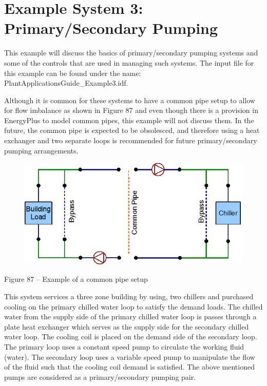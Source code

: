 \chapter{Example System 3: Primary/Secondary Pumping}\label{example-system-3-primarysecondary-pumping}

This example will discuss the basics of primary/secondary pumping systems and some of the controls that are used in managing such systems. The input file for this example can be found under the name: PlantApplicationsGuide\_Example3.idf.

Although it is common for these systems to have a common pipe setup to allow for flow imbalance as shown in Figure 87 and even though there is a provision in EnergyPlus to model common pipes, this example will not discuss them. In the future, the common pipe is expected to be obsolesced, and therefore using a heat exchanger and two separate loops is recommended for future primary/secondary pumping arrangements.

\begin{figure}[htbp]
\centering
\includegraphics{media/image087.png}
\caption{}
\end{figure}

Figure 87 -- Example of a common pipe setup

This system services a three zone building by using, two chillers and purchased cooling on the primary chilled water loop to satisfy the demand loads. The chilled water from the supply side of the primary chilled water loop is passes through a plate heat exchanger which serves as the supply side for the secondary chilled water loop. The cooling coil is placed on the demand side of the secondary loop. The primary loop uses a constant speed pump to circulate the working fluid (water). The secondary loop uses a variable speed pump to manipulate the flow of the fluid such that the cooling coil demand is satisfied. The above mentioned pumps are considered as a primary/secondary pumping pair.

